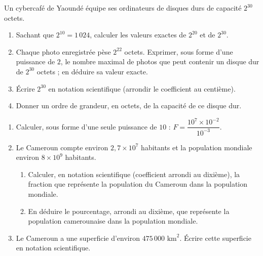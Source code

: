 Un cybercafé de Yaoundé équipe ses ordinateurs de disques durs de capacité $2^{30}$ octets.
\begin{enumerate}[label=\arabic*)]
\item Sachant que $2^{10}=1\,024$, calculer les valeurs exactes de $2^{20}$ et de $2^{30}$.
\item Chaque photo enregistrée pèse $2^{22}$ octets. Exprimer, sous forme d'une puissance de
$2$, le nombre maximal de photos que peut contenir un disque dur de $2^{30}$ octets ; en
déduire sa valeur exacte.
\item Écrire $2^{30}$ en notation scientifique (arrondir le coefficient au centième).
\item Donner un ordre de grandeur, en octets, de la capacité de ce disque dur.
\end{enumerate}

\begin{enumerate}[label=\arabic*)]
\item Calculer, sous forme d'une seule puissance de $10$ :
$F=\dfrac{10^{7}\times10^{-2}}{10^{-3}}$.
\item Le Cameroun compte environ $2{,}7\times10^{7}$ habitants et la population mondiale
environ $8\times10^{9}$ habitants.
\begin{enumerate}[label=\alph*)]
\item Calculer, en notation scientifique (coefficient arrondi au dixième), la fraction que
représente la population du Cameroun dans la population mondiale.
\item En déduire le pourcentage, arrondi au dixième, que représente la population
camerounaise dans la population mondiale.
\end{enumerate}
\item Le Cameroun a une superficie d'environ $475\,000\text{ km}^{2}$. Écrire cette
superficie en notation scientifique.
\end{enumerate}

